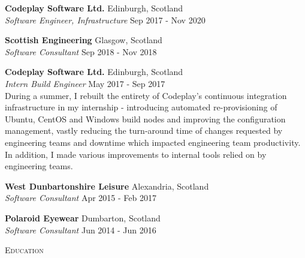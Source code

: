 \documentclass[a4paper]{article}
\newcommand{\lineunder} {
  \vspace*{-8pt} \\
  \hspace*{-18pt} \hrulefill \\
}
\newcommand{\header} [1] {
  {\hspace*{-18pt}\vspace*{6pt} \textsc{#1}}
  \vspace*{-6pt} \lineunder
}
\begin{document}
\textbf{Codeplay Software Ltd.} \hfill {\color{gray} Edinburgh, Scotland} \\
\textit{Software Engineer, Infrastructure} \hfill {\color{gray} Sep 2017 - Nov 2020} \\
\vspace{2mm}

\textbf{Scottish Engineering} \hfill {\color{gray} Glasgow, Scotland} \\
\textit{Software Consultant} \hfill {\color{gray} Sep 2018 - Nov 2018} \\
\vspace{2mm}

\textbf{Codeplay Software Ltd.} \hfill {\color{gray} Edinburgh, Scotland} \\
\textit{Intern Build Engineer} \hfill {\color{gray} May 2017 - Sep 2017} \\
\vspace{2mm}
During a summer, I rebuilt the entirety of Codeplay's continuous integration infrastructure
in my internship - introducing automated re-provisioning of Ubuntu, CentOS and Windows build nodes
and improving the configuration management, vastly reducing the turn-around time of changes
requested by engineering teams and downtime which impacted engineering team productivity. In
addition, I made various improvements to internal tools relied on by engineering teams.
\vspace{2mm}

\textbf{West Dunbartonshire Leisure} \hfill {\color{gray} Alexandria, Scotland} \\
\textit{Software Consultant} \hfill {\color{gray} Apr 2015 - Feb 2017} \\
\vspace{2mm}

\textbf{Polaroid Eyewear} \hfill {\color{gray} Dumbarton, Scotland} \\
\textit{Software Consultant} \hfill {\color{gray} Jun 2014 - Jun 2016} \\
\vspace{2mm}

\header{Education}
\vspace{1mm}
\end{document}
